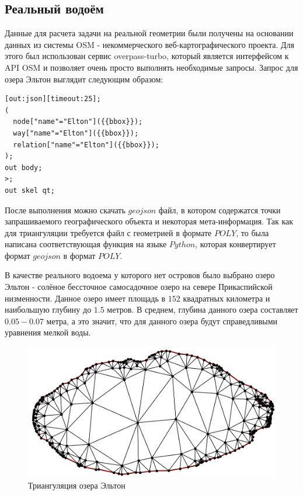\documentclass[14pt]{extreport}
\begin{document}
\subsection{Реальный водоём}

Данные для расчета задачи на реальной геометрии были получены на основании данных из системы OSM\cite{bib:website:osm} - некоммерческого веб-картографического проекта. Для этого был использован сервис overpass-turbo\cite{bib:website:overpassturbo}, который является интерфейсом к API OSM и позволяет очень просто выполнять необходимые запросы. Запрос для озера Эльтон выглядит следующим образом:


\begin{lstlisting}
[out:json][timeout:25];
(
  node["name"="Elton"]({{bbox}});
  way["name"="Elton"]({{bbox}});
  relation["name"="Elton"]({{bbox}});
);
out body;
>;
out skel qt;	
\end{lstlisting}

После выполнения можно скачать $geojson$ файл, в котором содержатся точки запрашиваемого географического объекта и некоторая мета-информация. Так как для триангуляции требуется файл с геометрией в формате $POLY$, то была написана соответствующая функция на языке $Python$, которая конвертирует формат $geojson$ в формат $POLY$.

В качестве реального водоема у которого нет островов было выбрано озеро Эльтон - солёное бессточное самосадочное озеро на севере Прикаспийской низменности. Данное озеро имеет площадь в $152$ квадратных километра и наибольшую глубину до $1.5$ метров. В среднем, глубина данного озера составляет $0.05 - 0.07$ метра, а это значит, что для данного озера будут справедливыми уравнения мелкой воды.

\begin{figure}[H]
\centerline{
\includegraphics[width=1.0\linewidth]{images/ex2/mesh}}
\caption{Триангуляция озера Эльтон}
\label{img:ex2:mesh}
\end{figure}
\end{document}
